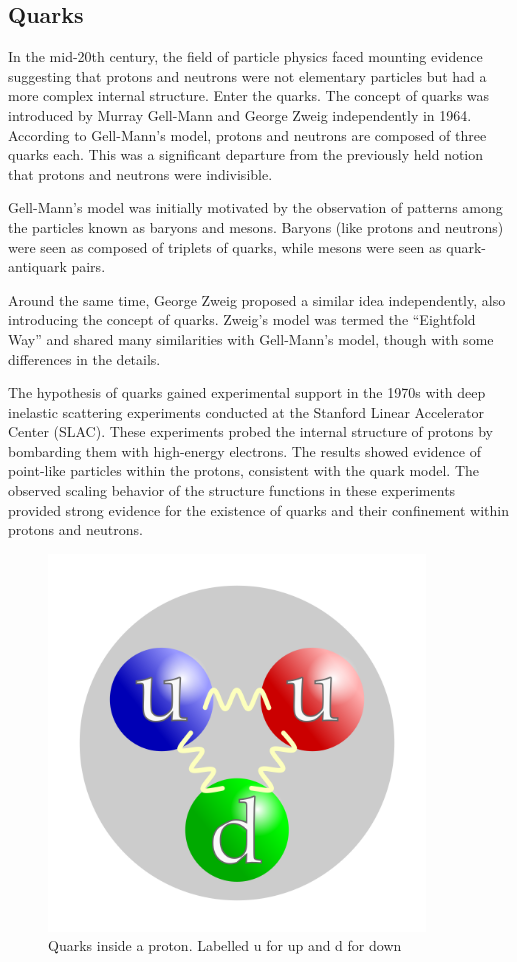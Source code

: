 \subsection{Quarks}

In the mid-20th century, the field of particle physics faced mounting evidence suggesting that protons and neutrons were not elementary particles but had a more complex internal structure.
Enter the quarks.
The concept of quarks was introduced by Murray Gell-Mann and George Zweig independently in 1964.
According to Gell-Mann's model, protons and neutrons are composed of three quarks each.
This was a significant departure from the previously held notion that protons and neutrons were indivisible.

Gell-Mann's model was initially motivated by the observation of patterns among the particles known as baryons and mesons.
Baryons (like protons and neutrons) were seen as composed of triplets of quarks, while mesons were seen as quark-antiquark pairs.

Around the same time, George Zweig proposed a similar idea independently, also introducing the concept of quarks.
Zweig's model was termed the ``Eightfold Way'' and shared many similarities with Gell-Mann's model, though with some differences in the details.

The hypothesis of quarks gained experimental support in the 1970s with deep inelastic scattering experiments conducted at the Stanford Linear Accelerator Center (SLAC).
These experiments probed the internal structure of protons by bombarding them with high-energy electrons.
The results showed evidence of point-like particles within the protons, consistent with the quark model.
The observed scaling behavior of the structure functions in these experiments provided strong evidence for the existence of quarks and their confinement within protons and neutrons.

\begin{figure}[H]
  \centering
  \includegraphics[width=100mm]{figures/protonQuarks.png}
  \caption{Quarks inside a proton.
    Labelled u for up and d for down}
  \label{protonQuarks}
\end{figure}

